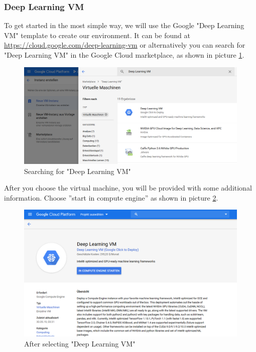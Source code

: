\documentclass[a4paper]{article}
\begin{document}
\subsubsection{Deep Learning VM}
To get started in the most simple way, we will use the Google "Deep Learning VM" template to create our environment. It can be found at \url{https://cloud.google.com/deep-learning-vm} or alternatively you can search for "Deep Learning VM" in the Google Cloud marketplace, as shown in picture \ref{fig_marketplaceSearch}.
\begin{figure}[H]
	\centerline{\includegraphics[width=\textwidth]{img/marketplaceSearch}}
	\caption{Searching for "Deep Learning VM"}
	\label{fig_marketplaceSearch}
\end{figure}
\noindent After you choose the virtual machine, you will be provided with some additional information. Choose ''start in compute engine'' as shown in picture \ref{fig_additionalInfo}.
\begin{figure}[H]
	\centerline{\includegraphics[width=\textwidth]{img/additionalInfo}}
	\caption{After selecting "Deep Learning VM"}
	\label{fig_additionalInfo}
\end{figure}
\end{document}
